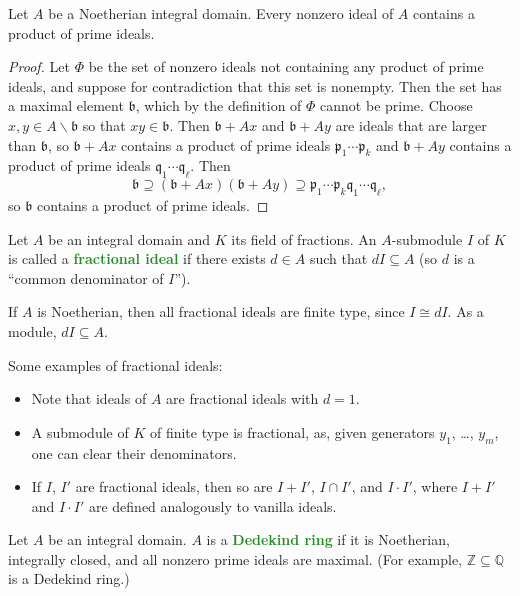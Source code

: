\documentclass[10pt]{scrartcl}
\providecommand{\QQ}{\mathbb Q}
\providecommand{\ZZ}{\mathbb Z}
\providecommand{\ii}{\item}
\providecommand{\setdiff}{\smallsetminus}
\providecommand{\vocab}[1]{{\textbf{\textcolor{ForestGreen}{#1}}}}
\begin{document}
\begin{lemma}
	Let $A$ be a Noetherian integral domain.
	Every nonzero ideal of $A$ contains a product of prime ideals.
\end{lemma}
\begin{proof}
	Let $\Phi$ be the set of nonzero ideals not containing
	any product of prime ideals, and suppose for contradiction that
	this set is nonempty. Then the set has a maximal element $\mathfrak b$,
	which by the definition of $\Phi$ cannot be prime.
	Choose $x,y\in A\setdiff\mathfrak b$ so that $xy\in\mathfrak b$.
	Then $\mathfrak b + Ax$ and $\mathfrak b + Ay$ are ideals that are
	larger than $\mathfrak b$, so $\mathfrak b + Ax$ contains
	a product of prime ideals $\mathfrak p_1\cdots\mathfrak p_k$
	and $\mathfrak b + Ay$ contains a product of prime ideals
	$\mathfrak q_1\cdots\mathfrak q_\ell$. Then
	\[\mathfrak b\supseteq
	(\mathfrak b + Ax)(\mathfrak b + Ay)\supseteq
	\mathfrak p_1\cdots \mathfrak p_k\mathfrak q_1\cdots\mathfrak q_\ell,\]
	so $\mathfrak b$ contains a product of prime ideals.
\end{proof}

\begin{definition}
	Let $A$ be an integral domain and $K$ its field of fractions.
	An $A$-submodule $I$ of $K$ is called a \vocab{fractional ideal}
	if there exists $d\in A$ such that $dI\subseteq A$
	(so $d$ is a ``common denominator of $I$'').
\end{definition}

If $A$ is Noetherian, then all fractional ideals are finite type, since
$I\cong dI$. As a module, $dI\subseteq A$.

\begin{example}
	Some examples of fractional ideals:
	\begin{itemize}
		\ii Note that ideals of $A$ are fractional ideals with $d = 1$.
	
		\ii A submodule of $K$ of finite type is fractional, as,
		given generators $y_1$, \dots, $y_m$, one can clear their denominators.
	
		\ii If $I$, $I'$ are fractional ideals, then so are
		$I+I'$, $I\cap I'$, and $I\cdot I'$, where $I+I'$ and $I\cdot I'$
		are defined analogously to vanilla ideals.
	\end{itemize}
\end{example}

\begin{definition}
	Let $A$ be an integral domain. $A$ is a \vocab{Dedekind ring}
	if it is Noetherian, integrally closed, and all nonzero prime ideals
	are maximal. (For example, $\ZZ\subseteq\QQ$ is a Dedekind ring.)
\end{definition}
\end{document}
